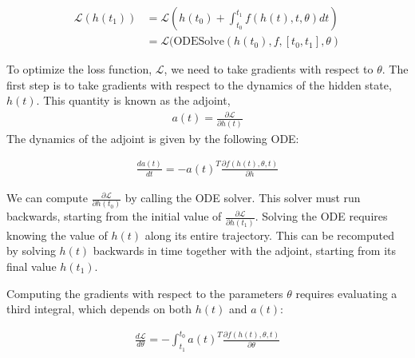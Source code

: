 \documentclass[book.tex]{subfiles}
\begin{document}
\begin{align}
\mathcal{L}(h(t_1)) &= \mathcal{L}\left(h(t_0) + \int^{t_1}_{t_0} f(h(t),t,\theta)dt\right) \\
&= \mathcal{L}(\textrm{ODESolve}(h(t_0),f,[t_0,t_1],\theta)
\end{align}

To optimize the loss function, $\mathcal{L}$, we need to take gradients with respect to $\theta$.  The first step is to take gradients with respect to the dynamics of the hidden state, $h(t)$.  This quantity is known as the adjoint, 
\begin{align}
a(t) = \frac{\partial \mathcal{L}}{\partial h(t)}
\end{align}  
The dynamics of the adjoint is given by the following ODE:

\begin{align}
    \frac{da(t)}{dt} = - a(t)^T \frac{\partial f(h(t),\theta,t)}{\partial h} 
\end{align}


We can compute $\frac{\partial \mathcal{L}}{\partial h(t_0)}$ by calling the
ODE solver. This solver must run backwards,
starting from the initial value of $\frac{\partial \mathcal{L}}{\partial h(t_1)}$.  Solving the ODE requires knowing the value of $h(t)$ along its entire trajectory.  This can be recomputed by solving $h(t)$ backwards in time together with the adjoint, starting from its final value $h(t_1)$.

Computing the gradients with respect to the parameters $\theta$ requires evaluating a third integral, which depends on both $h(t)$ and $a(t)$:

\begin{align}
    \frac{d\mathcal{L}}{d\theta} = - \int_{t_1}^{t_0} a(t)^T \frac{\partial f(h(t),\theta,t)}{\partial \theta} 
\end{align}
\end{document}
